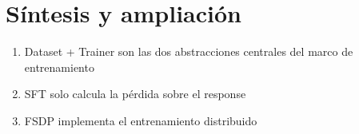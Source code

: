 \section{Síntesis y ampliación}
\begin{enumerate}
  \item Dataset + Trainer son las dos abstracciones centrales del marco de entrenamiento
  \item SFT solo calcula la pérdida sobre el response
  \item FSDP implementa el entrenamiento distribuido
\end{enumerate}

